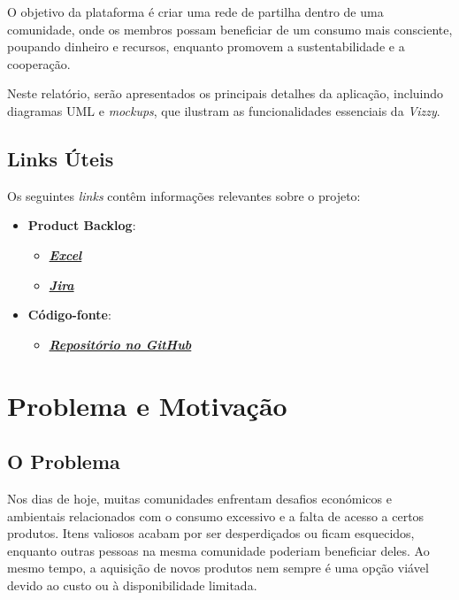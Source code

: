 \documentclass[a4paper, 12pt]{article} %
\begin{document}
O objetivo da plataforma é criar uma rede de partilha dentro de uma comunidade, onde os membros possam beneficiar de um consumo mais consciente, poupando dinheiro e recursos, enquanto promovem a sustentabilidade e a cooperação.

Neste relatório, serão apresentados os principais detalhes da aplicação, incluindo diagramas UML e \textit{mockups}, que ilustram as funcionalidades essenciais da \textit{Vizzy}.
\subsection{Links Úteis}

Os seguintes \textit{links} contêm informações relevantes sobre o projeto:

\begin{itemize}
	\item \textbf{Product Backlog}:
	\begin{itemize}
		\item [ ] \href{https://ipcapt-my.sharepoint.com/:x:/g/personal/nfr\_ipca\_pt/Eb29k3z-aWRGisXGIZopL6IBy5l5QZjY8SjG1iWQDl6c7w?rtime=jE\_b04Za3Ug}{\textbf{\textit{Excel}}}
		\item [ ] \href{https://basigraphics.atlassian.net/jira/software/projects/VIZZY/boards/1/backlog?epics=visible&atlOrigin=eyJpIjoiOGNmZTQ2MDRmNjQ1NDY0NDgwNDk0MDJiMGM0MDdlZWYiLCJwIjoiaiJ9}{\textbf{\textit{Jira}}}
	\end{itemize}
	\item \textbf{Código-fonte}:
	\begin{itemize}
		\item [ ] \href{https://github.com/Basiiii/Vizzy}{\textbf{\textit{Repositório no GitHub}}}
	\end{itemize}
\end{itemize}


\newpage
\section{Problema e Motivação}

\subsection{O Problema}

Nos dias de hoje, muitas comunidades enfrentam desafios económicos e ambientais relacionados com o consumo excessivo e a falta de acesso a certos produtos. Itens valiosos acabam por ser desperdiçados ou ficam esquecidos, enquanto outras pessoas na mesma comunidade poderiam beneficiar deles. Ao mesmo tempo, a aquisição de novos produtos nem sempre é uma opção viável devido ao custo ou à disponibilidade limitada.
\end{document}
